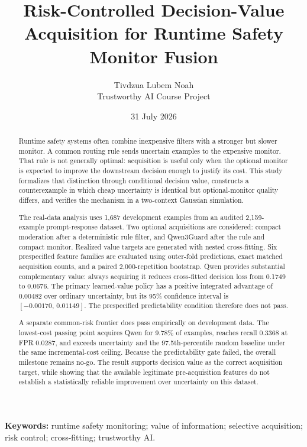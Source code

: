 \documentclass[11pt,a4paper]{article}
\title{\textbf{Risk-Controlled Decision-Value Acquisition for Runtime Safety Monitor Fusion}}
\author{Tivdzua Lubem Noah\\\small Trustworthy AI Course Project}
\date{31 July 2026}
\begin{document}
\maketitle
\thispagestyle{plain}

\begin{abstract}
Runtime safety systems often combine inexpensive filters with a stronger but slower monitor. A common routing rule sends uncertain examples to the expensive monitor. That rule is not generally optimal: acquisition is useful only when the optional monitor is expected to improve the downstream decision enough to justify its cost. This study formalizes that distinction through conditional decision value, constructs a counterexample in which cheap uncertainty is identical but optional-monitor quality differs, and verifies the mechanism in a two-context Gaussian simulation.

The real-data analysis uses 1,687 development examples from an audited 2,159-example prompt-response dataset. Two optional acquisitions are considered: compact moderation after a deterministic rule filter, and Qwen3Guard after the rule and compact monitor. Realized value targets are generated with nested cross-fitting. Six prespecified feature families are evaluated using outer-fold predictions, exact matched acquisition counts, and a paired 2,000-repetition bootstrap. Qwen provides substantial complementary value: always acquiring it reduces cross-fitted decision loss from 0.1749 to 0.0676. The primary learned-value policy has a positive integrated advantage of 0.00482 over ordinary uncertainty, but its 95\% confidence interval is $[-0.00170,\,0.01149]$. The prespecified predictability condition therefore does not pass.

A separate common-risk frontier does pass empirically on development data. The lowest-cost passing point acquires Qwen for 9.78\% of examples, reaches recall 0.3368 at FPR 0.0287, and exceeds uncertainty and the 97.5th-percentile random baseline under the same incremental-cost ceiling. Because the predictability gate failed, the overall milestone remains no-go. The result supports decision value as the correct acquisition target, while showing that the available legitimate pre-acquisition features do not establish a statistically reliable improvement over uncertainty on this dataset.
\end{abstract}

\noindent\textbf{Keywords:} runtime safety monitoring; value of information; selective acquisition; risk control; cross-fitting; trustworthy AI.
\vspace{0.8em}
\end{document}
